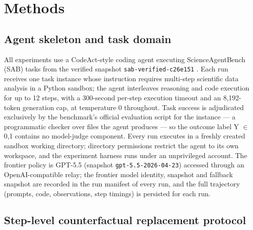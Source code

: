 \section{Methods}
\label{sec:methods}

\subsection*{Agent skeleton and task domain}

All experiments use a CodeAct-style coding agent executing ScienceAgentBench (SAB) tasks from the verified snapshot \texttt{sab-verified-c26e151} \cite{chen2024scienceagentbench}. Each run receives one task instance whose instruction requires multi-step scientific data analysis in a Python sandbox; the agent interleaves reasoning and code execution for up to 12 steps, with a 300-second per-step execution timeout and an 8,192-token generation cap, at temperature 0 throughout. Task success is adjudicated exclusively by the benchmark's official evaluation script for the instance --- a programmatic checker over files the agent produces --- so the outcome label Y $\in$ {0,1} contains no model-judge component. Every run executes in a freshly created sandbox working directory; directory permissions restrict the agent to its own workspace, and the experiment harness runs under an unprivileged account. The frontier policy is GPT-5.5 (snapshot \texttt{gpt-5.5-2026-04-23}) accessed through an OpenAI-compatible relay; the frontier model identity, snapshot and fallback snapshot are recorded in the run manifest of every run, and the full trajectory (prompts, code, observations, step timings) is persisted for each run.

\subsection*{Step-level counterfactual replacement protocol}

